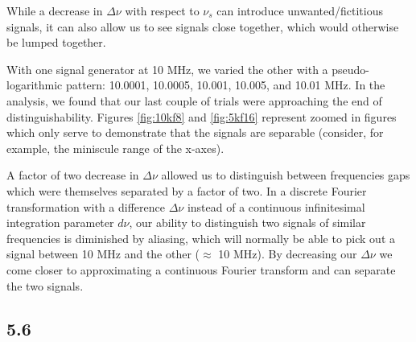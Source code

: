 \documentclass[a4paper]{article}
\begin{document}
While a decrease in $\Delta \nu$ with respect to $\nu_s$ can introduce unwanted/fictitious signals, it can also allow us to see signals close together, which would otherwise be lumped together.

With one signal generator at 10 MHz, we varied the other with a pseudo-logarithmic pattern: 10.0001, 10.0005, 10.001, 10.005, and 10.01 MHz. In the analysis, we found that our last couple of trials were approaching the end of distinguishability. Figures \ref{fig:10kf8} and \ref{fig:5kf16} represent zoomed in figures which only serve to demonstrate that the signals are separable (consider, for example, the miniscule range of the x-axes).

A factor of two decrease in $\Delta \nu$ allowed us to distinguish between frequencies gaps which were themselves separated by a factor of two. In a discrete Fourier transformation with a difference $\Delta \nu$ instead of a continuous infinitesimal integration parameter $d\nu$, our ability to distinguish two signals of similar frequencies is diminished by aliasing, which will normally be able to pick out a signal between 10 MHz and the other ($\approx$ 10 MHz). By decreasing our $\Delta \nu$ we come closer to approximating a continuous Fourier transform and can separate the two signals.

\subsection{5.6}
\end{document}
